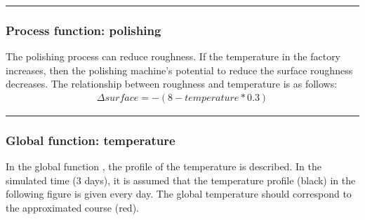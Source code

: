 \documentclass[letterpaper,10pt,english]{sphinxmanual}
\begin{document}
\bigskip\hrule\bigskip



\subsubsection{Process function: polishing}
\label{\detokenize{source/Examples/example02:process-function-polishing}}\label{\detokenize{source/Examples/example02:polishing}}
\sphinxAtStartPar
The polishing process can reduce roughness. If the temperature in the factory increases, then the polishing machine’s
potential to reduce the surface roughness decreases. The relationship between roughness and temperature is as follows:
\begin{equation*}
\begin{split}\Delta surface = - (8 - temperature * 0.3)\end{split}
\end{equation*}
\begin{sphinxVerbatim}[commandchars=\\\{\}]
    

          

     
\end{sphinxVerbatim}


\bigskip\hrule\bigskip



\subsubsection{Global function: temperature}
\label{\detokenize{source/Examples/example02:global-function-temperature}}\label{\detokenize{source/Examples/example02:temperature}}
\sphinxAtStartPar
In the global function , the profile of the temperature is described. In the simulated time (3 days),
it is assumed that the temperature profile (black) in the following figure is given every day. The global temperature
should correspond to the approximated course (red).

\end{document}

